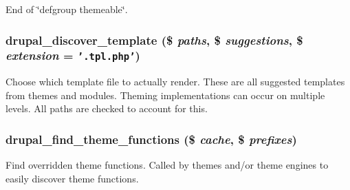 End of \char`\"{}defgroup themeable\char`\"{}. \hypertarget{includes_2theme_8inc_37b72ed30fd7ebc02fad346580eef2c4}{
\subsubsection[{drupal\_\-discover\_\-template}]{\setlength{\rightskip}{0pt plus 5cm}drupal\_\-discover\_\-template (\$ {\em paths}, \/  \$ {\em suggestions}, \/  \$ {\em extension} = {\tt '.tpl.php'})}}
\label{includes_2theme_8inc_37b72ed30fd7ebc02fad346580eef2c4}


Choose which template file to actually render. These are all suggested templates from themes and modules. Theming implementations can occur on multiple levels. All paths are checked to account for this. \hypertarget{includes_2theme_8inc_38b3ec5ba23e776b29f3f907a75711f1}{
\subsubsection[{drupal\_\-find\_\-theme\_\-functions}]{\setlength{\rightskip}{0pt plus 5cm}drupal\_\-find\_\-theme\_\-functions (\$ {\em cache}, \/  \$ {\em prefixes})}}
\label{includes_2theme_8inc_38b3ec5ba23e776b29f3f907a75711f1}


Find overridden theme functions. Called by themes and/or theme engines to easily discover theme functions.


